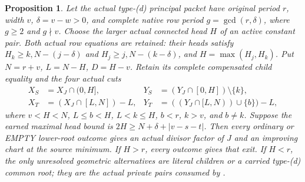 \documentclass[11pt,a4paper]{amsart}
\numberwithin{equation}{section}
\theoremstyle{plain}
\newtheorem{proposition}[theorem]{Proposition}
\theoremstyle{definition}
\begin{document}
\begin{proposition}\label{ge:high-head}
Let the actual type-(d) principal packet have original period \(r\),
width \(v\), \(\delta=v-w>0\), and complete native row period
\(g=\gcd(r,\delta)\), where \(g\ge2\) and \(g\nmid v\).
Choose the larger actual connected head \(H\) of an active constant
pair.  Both actual row equations are retained: their heads satisfy
\(H_k\ge k,N-(j-\delta)\) and
\(H_j\ge j,N-(k-\delta)\), and \(H=\max(H_j,H_k)\).
Put \(N=r+v\), \(L=N-H\), \(D=H-v\).
Retain its complete compensated child equality and the four actual cuts
\[
\begin{aligned}
 X_S&=X_J\cap(0,H],&Y_S&=(Y_J\cap[0,H])\setminus\{k\},\\
 X_T&=(X_J\cap[L,N])-L,&
 Y_T&=((Y_J\cap[L,N))\cup\{b\})-L,
\end{aligned}
\]
where \(v<H<N\), \(L\le b<H\), \(L<k\le H\),
\(b<r\), \(k>v\), and \(b\ne k\).  Suppose the earned maximal
head bound is
\(2H\ge N+\delta+|v-s-t|\).
Then every ordinary or EMPTY lower-root outcome gives an actual divisor
factor of \(J\) and an improving chart at the source minimum.  If
\(H>r\), every outcome gives that exit.  If \(H<r\), the only
unresolved geometric alternatives are literal children or a carried
type-(d) common root; they are the actual private pairs consumed by
.
\end{proposition}
\end{document}

